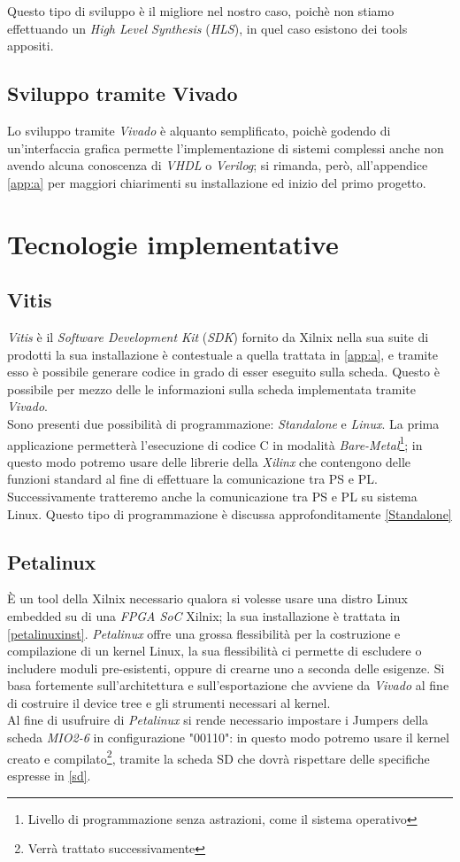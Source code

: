 Questo tipo di sviluppo è il migliore nel nostro caso, poichè non stiamo effettuando un \textit{High Level Synthesis} (\textit{HLS}), in quel caso esistono dei tools appositi.
\subsection{Sviluppo tramite Vivado}
Lo sviluppo tramite \textit{Vivado} è alquanto semplificato, poichè godendo di un'interfaccia grafica permette l'implementazione di sistemi complessi anche non avendo alcuna conoscenza di \textit{VHDL} o \textit{Verilog}; si rimanda, però, all'appendice \ref{app:a} per maggiori chiarimenti su installazione ed inizio del primo progetto.
\section{Tecnologie implementative}
\subsection{Vitis}
\textit{Vitis} è il \textit{Software Development Kit} (\textit{SDK}) fornito da Xilnix nella sua suite di prodotti la sua installazione è contestuale a quella trattata in \ref{app:a}, e tramite esso è possibile generare codice  in grado di esser eseguito sulla scheda. Questo è possibile per mezzo delle le informazioni sulla scheda implementata tramite \textit{Vivado}.\\
Sono presenti due possibilità di programmazione: \textit{Standalone} e \textit{Linux}. La prima applicazione permetterà l'esecuzione di codice C in modalità \textit{Bare-Metal}\footnote{Livello di programmazione senza astrazioni, come il sistema operativo}; in questo modo potremo usare delle librerie della \textit{Xilinx} che contengono delle funzioni standard al fine di effettuare la comunicazione tra PS e PL. Successivamente tratteremo anche la comunicazione tra PS e PL su sistema Linux. Questo tipo di programmazione è discussa approfonditamente \ref{Standalone}
\subsection{Petalinux}
È un tool della Xilnix necessario qualora si volesse usare una distro Linux embedded su di una \textit{FPGA SoC} Xilnix; la sua installazione è trattata in \ref{petalinuxinst}. \textit{Petalinux} offre una grossa flessibilità per la costruzione e compilazione di un kernel Linux, la sua flessibilità ci permette di escludere o includere moduli pre-esistenti, oppure di crearne uno a seconda delle esigenze. Si basa fortemente sull'architettura e sull'esportazione che avviene da \textit{Vivado} al fine di costruire il device tree e gli strumenti necessari al kernel.\\
Al fine di usufruire di \textit{Petalinux} si rende necessario impostare i Jumpers della scheda \textit{MIO2-6} in configurazione  "00110": in questo modo potremo usare il kernel creato e compilato\footnote{Verrà trattato successivamente}, tramite la scheda SD che dovrà rispettare delle specifiche espresse in \ref{sd}.
